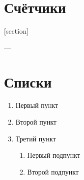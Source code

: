 \documentclass[12pt, a4paper]{article}
\theoremstyle{plain}              %
\theoremstyle{definition}         %
\begin{document}
\section{Счётчики}


[section]

\setcounter{jtem}{13}











\thesection --- \thepage

\renewcommand{\thepage}{\roman{page}}

\renewcommand{\thesection}{\Asbuk{section}}
\setcounter{section}{0}





\section{Списки}

\begin{enumerate}
	\renewcommand{\labelenumi}{\Roman{enumi}}
	\renewcommand{\labelenumii}{\asbuk{enumii}}
\item Первый пункт
\item Второй пункт
\item Третий пункт
\begin{enumerate}
\item Первый подпункт
\item Второй подпункт
\end{enumerate}
\end{enumerate}
\end{document}
